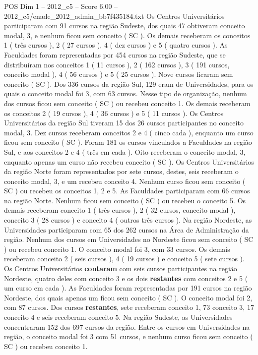 \begin{textsample}{POS Dim 1 – 2012\_c5 – Score 6.00 – 2012\_c5/enade\_2012\_admin\_bb7f435184.txt}
Os Centros Universitários participaram com 91 cursos na região Sudeste, dos quais 47 obtiveram conceito modal, 3, e nenhum ficou sem conceito ( SC ).
Os demais receberam os conceitos 1 ( três cursos ), 2 ( 27 cursos ), 4 ( dez cursos ) e 5 ( quatro cursos ).
As Faculdades foram representadas por 454 cursos na região Sudeste, que se distribuíram nos conceitos 1 ( 11 cursos ), 2 ( 162 cursos ), 3 ( 191 cursos, conceito modal ), 4 ( 56 cursos ) e 5 ( 25 cursos ).
Nove cursos ficaram sem conceito ( SC ).
Dos 336 cursos da região Sul, 129 eram de Universidades, para os quais o conceito modal foi 3, com 63 cursos.
Nesse tipo de organização, nenhum dos cursos ficou sem conceito ( SC ) ou recebeu conceito 1.
Os demais receberam os conceitos 2 ( 19 cursos ), 4 ( 36 cursos ) e 5 ( 11 cursos ).
Os Centros Universitários da região Sul tiveram 15 dos 26 cursos participantes no conceito modal, 3.
Dez cursos receberam conceitos 2 e 4 ( cinco cada ), enquanto um curso ficou sem conceito ( SC ).
Foram 181 os cursos vinculados a Faculdades na região Sul, e aos conceitos 2 e 4 ( três em cada ).
Oito receberam o conceito modal, 3, enquanto apenas um curso não recebeu conceito ( SC ).
Os Centros Universitários da região Norte foram representados por sete cursos, destes, seis receberam o conceito modal, 3, e um recebeu conceito 4.
Nenhum curso ficou sem conceito ( SC ) ou recebeu os conceitos 1, 2 e 5.
As Faculdades participaram com 66 cursos na região Norte.
Nenhum ficou sem conceito ( SC ) ou recebeu o conceito 5.
Os demais receberam conceito 1 ( três cursos ), 2 ( 32 cursos, conceito modal ), conceito 3 ( 28 cursos ) e conceito 4 ( outros três cursos ).
Na região Nordeste, as Universidades participaram com 65 dos 262 cursos na Área de Administração da região.
Nenhum dos cursos em Universidades no Nordeste ficou sem conceito ( SC ) ou recebeu conceito 1.
O conceito modal foi 3, com 33 cursos.
Os demais receberam conceito 2 ( seis cursos ), 4 ( 19 cursos ) e conceito 5 ( sete cursos ).
Os Centros Universitários \textbf{contaram} com seis cursos participantes na região Nordeste, quatro deles com conceito 3 e os dois \textbf{restantes} com conceitos 2 e 5 ( um curso em cada ).
As Faculdades foram representadas por 191 cursos na região Nordeste, dos quais apenas um ficou sem conceito ( SC ).
O conceito modal foi 2, com 87 cursos.
Dos cursos \textbf{restantes}, sete receberam conceito 1, 73 conceito 3, 17 conceito 4 e seis receberam conceito 5.
Na região Sudeste, as Universidades concentraram 152 dos 697 cursos da região.
Entre os cursos em Universidades na região, o conceito modal foi 3 com 51 cursos, e nenhum curso ficou sem conceito ( SC ) ou recebeu conceito 1.

\end{textsample}
